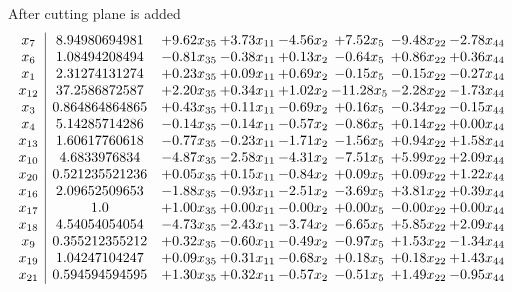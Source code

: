 \documentclass[8pt]{article}
\begin{document}
 After cutting plane is added 
\[\begin{array}{c| c c@{\hskip 2pt} c@{\hskip 2pt} c@{\hskip 2pt} c@{\hskip 2pt} c@{\hskip 2pt} c@{\hskip 2pt} }
 x_{7}   &  8.94980694981 & +  9.62 x_{35} & +  3.73 x_{11} & -4.56 x_{2} & +  7.52 x_{5} & -9.48 x_{22} & -2.78 x_{44}\\
 x_{6}   &  1.08494208494 & -0.81 x_{35} & -0.38 x_{11} & +  0.13 x_{2} & -0.64 x_{5} & +  0.86 x_{22} & +  0.36 x_{44}\\
 x_{1}   &  2.31274131274 & +  0.23 x_{35} & +  0.09 x_{11} & +  0.69 x_{2} & -0.15 x_{5} & -0.15 x_{22} & -0.27 x_{44}\\
 x_{12}   &  37.2586872587 & +  2.20 x_{35} & +  0.34 x_{11} & +  1.02 x_{2} & -11.28 x_{5} & -2.28 x_{22} & -1.73 x_{44}\\
 x_{3}   &  0.864864864865 & +  0.43 x_{35} & +  0.11 x_{11} & -0.69 x_{2} & +  0.16 x_{5} & -0.34 x_{22} & -0.15 x_{44}\\
 x_{4}   &  5.14285714286 & -0.14 x_{35} & -0.14 x_{11} & -0.57 x_{2} & -0.86 x_{5} & +  0.14 x_{22} & +  0.00 x_{44}\\
 x_{13}   &  1.60617760618 & -0.77 x_{35} & -0.23 x_{11} & -1.71 x_{2} & -1.56 x_{5} & +  0.94 x_{22} & +  1.58 x_{44}\\
 x_{10}   &  4.6833976834 & -4.87 x_{35} & -2.58 x_{11} & -4.31 x_{2} & -7.51 x_{5} & +  5.99 x_{22} & +  2.09 x_{44}\\
 x_{20}   &  0.521235521236 & +  0.05 x_{35} & +  0.15 x_{11} & -0.84 x_{2} & +  0.09 x_{5} & +  0.09 x_{22} & +  1.22 x_{44}\\
 x_{16}   &  2.09652509653 & -1.88 x_{35} & -0.93 x_{11} & -2.51 x_{2} & -3.69 x_{5} & +  3.81 x_{22} & +  0.39 x_{44}\\
 x_{17}   &  1.0 & +  1.00 x_{35} & +  0.00 x_{11} & -0.00 x_{2} & +  0.00 x_{5} & -0.00 x_{22} & +  0.00 x_{44}\\
 x_{18}   &  4.54054054054 & -4.73 x_{35} & -2.43 x_{11} & -3.74 x_{2} & -6.65 x_{5} & +  5.85 x_{22} & +  2.09 x_{44}\\
 x_{9}   &  0.355212355212 & +  0.32 x_{35} & -0.60 x_{11} & -0.49 x_{2} & -0.97 x_{5} & +  1.53 x_{22} & -1.34 x_{44}\\
 x_{19}   &  1.04247104247 & +  0.09 x_{35} & +  0.31 x_{11} & -0.68 x_{2} & +  0.18 x_{5} & +  0.18 x_{22} & +  1.43 x_{44}\\
 x_{21}   &  0.594594594595 & +  1.30 x_{35} & +  0.32 x_{11} & -0.57 x_{2} & -0.51 x_{5} & +  1.49 x_{22} & -0.95 x_{44}\\

\end{array}\]
\end{document}
